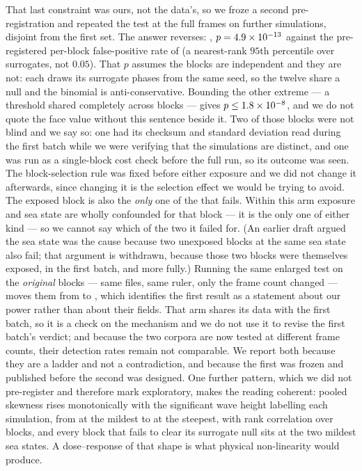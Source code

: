 \documentclass[review]{elsarticle}
\begin{document}
That last constraint was ours, not the data's, so we froze a second pre-registration
and repeated the test at the full \TOneFrames{} frames on \TOneBN{} further
simulations, disjoint from the first set. The answer reverses: \TOneBWin{},
$p = 4.9\times 10^{-13}{}$ against the pre-registered per-block false-positive rate of
\TOneBFP{} (a nearest-rank $95$th percentile over \TOneNSur{} surrogates, not $0.05$).
That $p$ assumes the blocks are independent and they are not: each draws its surrogate
phases from the same seed, so the twelve share a null and the binomial is
anti-conservative. Bounding the other extreme --- a threshold shared completely across
blocks --- gives $p \le 1.8\times 10^{-8}{}$, and we do not quote the face value without
this sentence beside it.
Two of those \TOneBN{} blocks were not blind and we say so: one had its checksum and
standard deviation read during the first batch while we were verifying that the
simulations are distinct, and one was run as a single-block cost check before the
full run, so its outcome was seen. The block-selection rule was fixed before either
exposure and we did not change it afterwards, since changing it is the selection
effect we would be trying to avoid. The exposed block is also the \emph{only} one of
the \TOneBN{} that fails. Within this arm exposure and sea state are wholly confounded
for that block --- it is the only one of either kind --- so we cannot say which of the
two it failed for. (An earlier draft argued the sea state was the cause because two
unexposed blocks at the same sea state also fail; that argument is withdrawn, because
those two blocks were themselves exposed, in the first batch, and more fully.)
Running the same enlarged test on the \emph{original} blocks --- same files, same
ruler, only the frame count changed --- moves them from \TOneWin{} to \TOneBSame{},
which identifies the first result as a statement about our power rather than about
their fields. That arm shares its data with the first batch, so it is a check on the
mechanism and we do not use it to revise the first batch's verdict; and because the
two corpora are now tested at different frame counts, their detection rates remain
not comparable. We report both because they
are a ladder and not a contradiction, and because the first was frozen and published
before the second was designed. One further pattern, which we did not pre-register and
therefore mark exploratory, makes the reading coherent: pooled skewness rises
monotonically with the significant wave height labelling each simulation, from
\TOneBSkewLo{} at the mildest to \TOneBSkewHi{} at the steepest, with rank correlation
\TOneBRho{} over \TOneBNBlocks{} blocks, and every block that fails to clear its
surrogate null sits at the two mildest sea states. A dose--response of that shape is
what physical non-linearity would produce.
\end{document}
